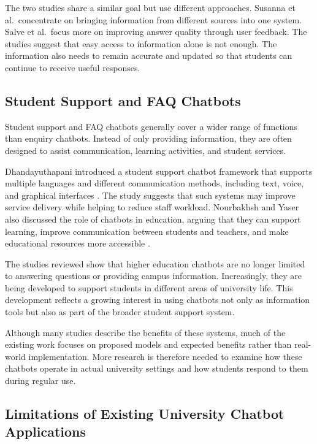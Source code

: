 \documentclass[12pt,a4paper]{article}
\begin{document}
The two studies share a similar goal but use different approaches. Susanna et al.\ concentrate on bringing information from different sources into one system. Salve et al.\ focus more on improving answer quality through user feedback. The studies suggest that easy access to information alone is not enough. The information also needs to remain accurate and updated so that students can continue to receive useful responses.

\subsection{Student Support and FAQ Chatbots}

Student support and FAQ chatbots generally cover a wider range of functions than enquiry chatbots. Instead of only providing information, they are often designed to assist communication, learning activities, and student services.

Dhandayuthapani introduced a student support chatbot framework that supports multiple languages and different communication methods, including text, voice, and graphical interfaces \cite{dhandayuthapani2022}. The study suggests that such systems may improve service delivery while helping to reduce staff workload. Nourbakhsh and Yaser also discussed the role of chatbots in education, arguing that they can support learning, improve communication between students and teachers, and make educational resources more accessible \cite{nourbakhsh2017}.

The studies reviewed show that higher education chatbots are no longer limited to answering questions or providing campus information. Increasingly, they are being developed to support students in different areas of university life. This development reflects a growing interest in using chatbots not only as information tools but also as part of the broader student support system.

Although many studies describe the benefits of these systems, much of the existing work focuses on proposed models and expected benefits rather than real-world implementation. More research is therefore needed to examine how these chatbots operate in actual university settings and how students respond to them during regular use.

\subsection{Limitations of Existing University Chatbot Applications}
\end{document}
